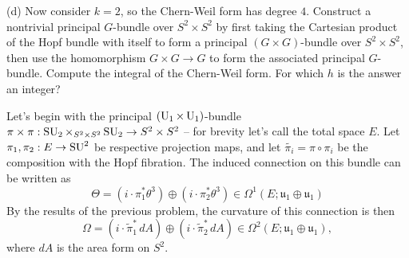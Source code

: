 \documentclass{../../templates/lkx_pset}
\begin{document}
\begin{parts}
	\begin{part}{(d)}
		Now consider $k=2$, so the Chern-Weil form has degree $4$. Construct a nontrivial principal $G$-bundle over $S^2\times S^2$ by first taking the Cartesian product of the Hopf bundle with itself to form a principal $(G\times G)$-bundle over $S^2\times S^2$, then use the homomorphism $G\times G\to G$ to form the associated principal $G$-bundle. Compute the integral of the Chern-Weil form. For which $h$ is the answer an integer?
	\end{part}

	Let's begin with the principal $(\operatorname{U}_1\times \operatorname{U}_1)$-bundle $\pi \times \pi : \operatorname{SU}_2\times_{S^2\times S^2} \operatorname{SU}_2 \to S^2\times S^2$ -- for brevity let's call the total space $E$. Let $\pi_1,\pi_2 : E \to \operatorname{SU}^2$ be respective projection maps, and let $\widetilde{\pi_i}=\pi\circ \pi_i$ be the composition with the Hopf fibration. The induced connection on this bundle can be written as
	\[
		\Theta = (i\cdot \pi_1^*\theta^3) \oplus (i\cdot \pi_2^*\theta^3) \in \Omega^1(E; \mathfrak{u}_1\oplus \mathfrak{u}_1)
	\]
	By the results of the previous problem, the curvature of this connection is then
	\[
		\Omega = (i\cdot \widetilde{\pi}_1^*\, dA) \oplus (i \cdot \widetilde{\pi}_2^*\, dA) \in \Omega^2(E; \mathfrak{u}_1\oplus\mathfrak{u}_1),
	\]
	where $dA$ is the area form on $S^2$.



\end{parts}
\end{document}
